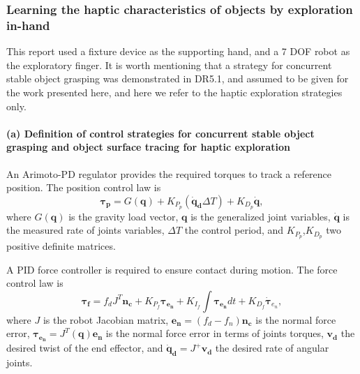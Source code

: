 
\subsubsection{Learning the haptic characteristics of objects by exploration in-hand}
\label{sec:ControlAlgorithms}

This report used a fixture device as the supporting hand, and a 7 DOF robot as the exploratory finger. It is worth mentioning that a strategy for concurrent stable object grasping was demonstrated in DR5.1, and assumed to be given for the work presented here, and here we refer to the haptic exploration strategies only.

\paragraph{(a) Definition of control strategies for concurrent stable object grasping and object surface tracing for haptic exploration}

An Arimoto-PD regulator provides the required torques to track a reference position. The position control law is
\begin{equation}
    \bm{\tau_p} = G(\bm{q}) + K_{P_p} \left(\bm{\dot{q}_d}\Delta T\right) + K_{D_p}\bm{\dot{q}},
\end{equation}
where $G(\bm{q})$ is the gravity load vector, $\bm{{q}}$  is the generalized joint variables, $\bm{\dot{q}}$ is the measured rate of joints variables, $\Delta T$ the control period, and $K_{P_p}$,$K_{D_p}$ two positive definite matrices.


A PID force controller is required to ensure contact during motion. The force control law is
\begin{equation}
    \bm{\tau_f} = f_dJ^T\bm{n_c} + K_{P_f}\bm{\tau_{e_n}} + K_{I_f}\int\bm{\tau_{e_n}}dt + K_{D_f}\dot{\bm{\tau}}_{e_n},
\end{equation}
where $J$ is the robot Jacobian matrix, $\bm{e_n} = (f_d - f_n)\bm{n_c}$ is the normal force error, $\bm{\tau_{e_n}} = J^T(\bm{q})\bm{e_n}$ is the normal force error in terms of joints torques, $\bm{v_d}$ the desired twist of the end effector, and $\bm{\dot{q}_d} = J^+\bm{v_d}$ the desired rate of angular joints.


